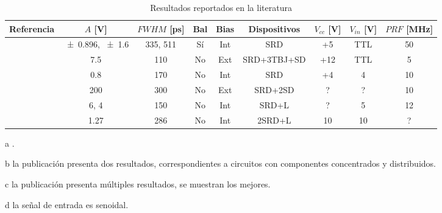 \begin{table}
  \begin{threeparttable}[b]
    \label{tab:mytable}
    \caption{Resultados reportados en la literatura}
    {\small
    \begin{tabular}{ccccccccc}
        \hline
        Referencia & $A$ [\unit{\volt}] & $FWHM$ [\unit{\pico\second}] &
        Bal \tnote{a} & Bias & Dispositivos & $V_{cc}$ [\unit{\volt}] & $V_{in}$ [\unit{\volt}] & $PRF$ [\unit{\mega\hertz}] \\
        \hline
        \cite{rulikowski2004} & \num{\pm 0.896}, \num{\pm 1.6} \tnote{b} & 335, 511 & Sí & Int & SRD & +5 & TTL & 50 \\
        \cite{protiva2009} & \num{7.5} & 110 & No & Ext & SRD+3TBJ+SD & +12 & TTL & 5 \\
        \cite{kamal2014} & \num{0.8} & 170 & No & Int & SRD & +4 & 4 & 10 \\
        \cite{han2002} & \num{200} & 300 & No & Ext & SRD+2SD & ? & ? & 10 \\
        \cite{han2005} & \num{+6}, \num{+4} & 150 & No & Int & SRD+L & ? & 5 & 12 \\
        \cite{oloumi2018} & \num{1.27} \tnote{c} & 286 & No & Int & 2SRD+L &
        10 & 10 \tnote{d} & ? \\
    \end{tabular}
}
   \begin{tablenotes}
     \item [a] .
     \item [b] la publicación presenta dos resultados, correspondientes a
       circuitos con componentes concentrados y distribuidos.
     \item [c] la publicación presenta múltiples resultados, se muestran
       los mejores.
     \item [d] la señal de entrada es senoidal.
   \end{tablenotes}
  \end{threeparttable}
\end{table}
